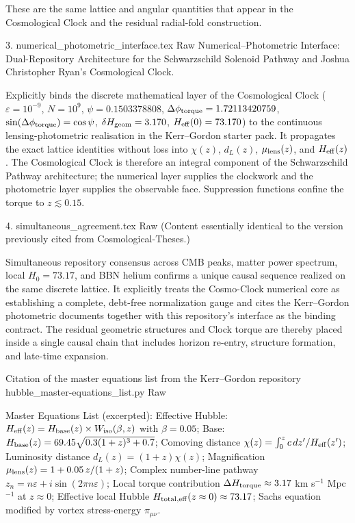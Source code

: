 These are the same lattice and angular quantities that appear in the Cosmological Clock and the residual radial-fold construction.

3. numerical_photometric_interface.tex  
Raw  
Numerical–Photometric Interface: Dual-Repository Architecture for the Schwarzschild Solenoid Pathway and Joshua Christopher Ryan's Cosmological Clock.  

Explicitly binds the discrete mathematical layer of the Cosmological Clock  
(\(\varepsilon=10^{-9}\), \(N=10^9\), \(\psi=0.1503378808\), \(\Delta\phi_{\rm torque}=1.72113420759\), \(\sin(\Delta\phi_{\rm torque})=\cos\psi\), \(\delta H_{\rm geom}=3.170\), \(H_{\rm eff}(0)=73.170\))  
to the continuous lensing-photometric realisation in the Kerr–Gordon starter pack. It propagates the exact lattice identities without loss into \(\chi(z)\), \(d_L(z)\), \(\mu_{\rm lens}(z)\), and \(H_{\rm eff}(z)\). The Cosmological Clock is therefore an integral component of the Schwarzschild Pathway architecture; the numerical layer supplies the clockwork and the photometric layer supplies the observable face. Suppression functions confine the torque to \(z\lesssim0.15\).

4. simultaneous_agreement.tex  
Raw  
(Content essentially identical to the version previously cited from Cosmological-Theses.)  

Simultaneous repository consensus across CMB peaks, matter power spectrum, local \(H_0=73.17\), and BBN helium confirms a unique causal sequence realized on the same discrete lattice. It explicitly treats the Cosmo-Clock numerical core as establishing a complete, debt-free normalization gauge and cites the Kerr–Gordon photometric documents together with this repository’s interface as the binding contract. The residual geometric structures and Clock torque are thereby placed inside a single causal chain that includes horizon re-entry, structure formation, and late-time expansion.

Citation of the master equations list from the Kerr–Gordon repository
hubble_master-equations_list.py  
Raw  

Master Equations List (excerpted):  
Effective Hubble: \(H_{\rm eff}(z)=H_{\rm base}(z)\times W_{\rm iso}(\beta,z)\) with \(\beta=0.05\);  
Base: \(H_{\rm base}(z)=69.45\sqrt{0.3(1+z)^3+0.7}\);  
Comoving distance \(\chi(z)=\int_0^z c\,dz'/H_{\rm eff}(z')\);  
Luminosity distance \(d_L(z)=(1+z)\chi(z)\);  
Magnification \(\mu_{\rm lens}(z)=1+0.05\,z/(1+z)\);  
Complex number-line pathway \(z_n=n\varepsilon+i\sin(2\pi n\varepsilon)\);  
Local torque contribution \(\Delta H_{\rm torque}\approx3.17\) km s\(^{-1}\) Mpc\(^{-1}\) at \(z\approx0\);  
Effective local Hubble \(H_{\rm total,eff}(z\approx0)\approx73.17\);  
Sachs equation modified by vortex stress-energy \(\pi_{\mu\nu}\).


